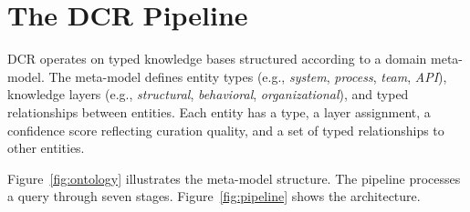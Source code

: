 \documentclass[11pt,a4paper]{article}
\begin{document}
\section{The DCR Pipeline}
\label{sec:pipeline}

DCR operates on typed knowledge bases structured according to a domain meta-model. The meta-model defines entity types (e.g., \textit{system}, \textit{process}, \textit{team}, \textit{API}), knowledge layers (e.g., \textit{structural}, \textit{behavioral}, \textit{organizational}), and typed relationships between entities. Each entity has a type, a layer assignment, a confidence score reflecting curation quality, and a set of typed relationships to other entities.

Figure~\ref{fig:ontology} illustrates the meta-model structure. The pipeline processes a query through seven stages. Figure~\ref{fig:pipeline} shows the architecture.
\end{document}
